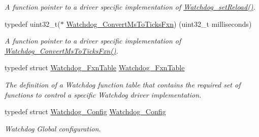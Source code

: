 \begin{DoxyCompactItemize}
\begin{DoxyCompactList}\small\item\em A function pointer to a driver specific implementation of \hyperlink{_watchdog_8h_a476ef7b9d4e7268717adf94d8505f4a5}{Watchdog\+\_\+set\+Reload()}. \end{DoxyCompactList}\item 
typedef uint32\+\_\+t($\ast$ \hyperlink{_watchdog_8h_aaf90926e5dc22cdca706b9aa86ee7580}{Watchdog\+\_\+\+Convert\+Ms\+To\+Ticks\+Fxn}) (uint32\+\_\+t milliseconds)
\begin{DoxyCompactList}\small\item\em A function pointer to a driver specific implementation of \hyperlink{_watchdog_8h_aaf90926e5dc22cdca706b9aa86ee7580}{Watchdog\+\_\+\+Convert\+Ms\+To\+Ticks\+Fxn()}. \end{DoxyCompactList}\item 
typedef struct \hyperlink{struct_watchdog___fxn_table}{Watchdog\+\_\+\+Fxn\+Table} \hyperlink{_watchdog_8h_ad3e804ec79af5e10e8ef3af301860ef5}{Watchdog\+\_\+\+Fxn\+Table}
\begin{DoxyCompactList}\small\item\em The definition of a Watchdog function table that contains the required set of functions to control a specific Watchdog driver implementation. \end{DoxyCompactList}\item 
typedef struct \hyperlink{struct_watchdog___config}{Watchdog\+\_\+\+Config} \hyperlink{_watchdog_8h_ad8c9eb8a1cd2934965d385293fc38647}{Watchdog\+\_\+\+Config}
\begin{DoxyCompactList}\small\item\em Watchdog Global configuration. \end{DoxyCompactList}\end{DoxyCompactItemize}
